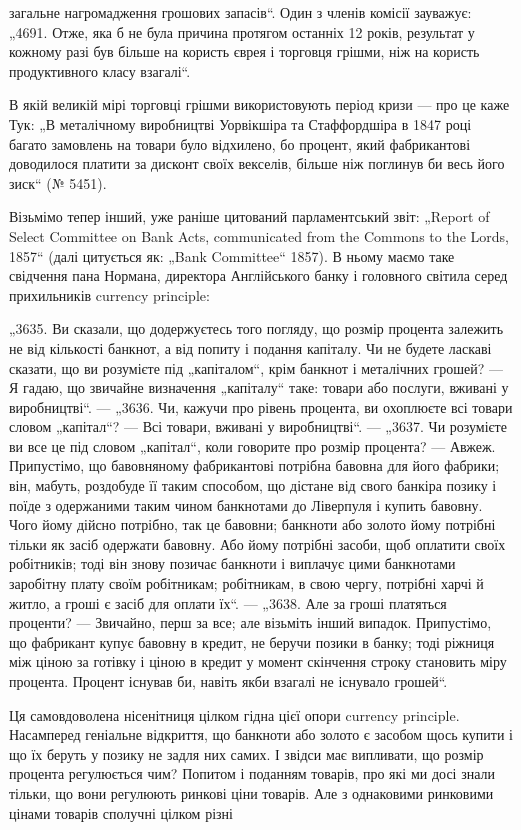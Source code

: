 загальне нагромадження грошових запасів“. Один з членів комісії
зауважує: „4691. Отже, яка б не була причина протягом
останніх 12 років, результат у кожному разі був більше на користь єврея і торговця грішми, ніж на
користь продуктивного
класу взагалі“.

В якій великій мірі торговці грішми використовують період
кризи — про це каже Тук: „В металічному виробництві Уорвікшіра та Стаффордшіра в 1847 році багато
замовлень на товари
було відхилено, бо процент, який фабрикантові доводилося платити за дисконт своїх векселів, більше
ніж поглинув би весь
його зиск“ (№ 5451).

Візьмімо тепер інший, уже раніше цитований парламентський
звіт: „Report of Select Committee on Bank Acts, communicated from
the Commons to the Lords, 1857“ (далі цитується як: „Bank Committee“ 1857). В ньому маємо таке
свідчення пана Нормана, директора Англійського банку і головного світила серед прихильників currency
principle:

„3635. Ви сказали, що додержуєтесь того погляду, що розмір
процента залежить не від кількості банкнот, а від попиту і подання капіталу. Чи не будете ласкаві
сказати, що ви розумієте під
„капіталом“, крім банкнот і металічних грошей? — Я гадаю, що звичайне визначення „капіталу“ таке:
товари або послуги, вживані
у виробництві“. — „3636. Чи, кажучи про рівень процента, ви
охоплюєте всі товари словом „капітал“? — Всі товари, вживані
у виробництві“. — „3637. Чи розумієте ви все це під словом
„капітал“, коли говорите про розмір процента? — Авжеж. Припустімо, що бавовняному фабрикантові
потрібна бавовна для його
фабрики; він, мабуть, роздобуде її таким способом, що дістане
від свого банкіра позику і поїде з одержаними таким чином
банкнотами до Ліверпуля і купить бавовну. Чого йому дійсно
потрібно, так це бавовни; банкноти або золото йому потрібні
тільки як засіб одержати бавовну. Або йому потрібні засоби,
щоб оплатити своїх робітників; тоді він знову позичає банкноти
і виплачує цими банкнотами заробітну плату своїм робітникам;
робітникам, в свою чергу, потрібні харчі й житло, а гроші є
засіб для оплати їх“. — „3638. Але за гроші платяться проценти? — Звичайно, перш за все; але
візьміть інший випадок. Припустімо, що фабрикант купує бавовну в кредит, не беручи позики
в банку; тоді ріжниця між ціною за готівку і ціною в кредит
у момент скінчення строку становить міру процента. Процент
існував би, навіть якби взагалі не існувало грошей“.

Ця самовдоволена нісенітниця цілком гідна цієї опори currency principle. Насамперед геніальне
відкриття, що банкноти
або золото є засобом щось купити і що їх беруть у позику не
задля них самих. І звідси має випливати, що розмір процента
регулюється чим? Попитом і поданням товарів, про які ми досі
знали тільки, що вони регулюють ринкові ціни товарів. Але
з однаковими ринковими цінами товарів сполучні цілком різні

